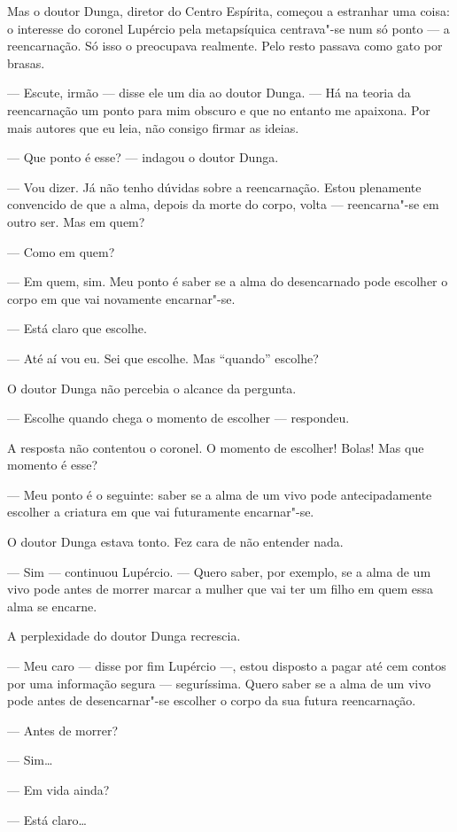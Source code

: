 Mas o doutor Dunga, diretor do Centro Espírita, começou a estranhar uma
coisa: o interesse do coronel Lupércio pela metapsíquica centrava"-se num
só ponto --- a reencarnação. Só isso o preocupava realmente. Pelo resto
passava como gato por brasas.

--- Escute, irmão --- disse ele um dia ao doutor Dunga. --- Há na teoria
da reencarnação um ponto para mim obscuro e que no entanto me apaixona.
Por mais autores que eu leia, não consigo firmar as ideias.

--- Que ponto é esse? --- indagou o doutor Dunga.

--- Vou dizer. Já não tenho dúvidas sobre a reencarnação. Estou
plenamente convencido de que a alma, depois da morte do corpo, volta ---
reencarna"-se em outro ser. Mas em quem?

--- Como em quem?

--- Em quem, sim. Meu ponto é saber se a alma do desencarnado pode
escolher o corpo em que vai novamente encarnar"-se.

--- Está claro que escolhe.

--- Até aí vou eu. Sei que escolhe. Mas ``quando'' escolhe?

O doutor Dunga não percebia o alcance da pergunta.

--- Escolhe quando chega o momento de escolher --- respondeu.

A resposta não contentou o coronel. O momento de escolher! Bolas! Mas
que momento é esse?

--- Meu ponto é o seguinte: saber se a alma de um vivo pode
antecipadamente escolher a criatura em que vai futuramente encarnar"-se.

O doutor Dunga estava tonto. Fez cara de não entender nada.

--- Sim --- continuou Lupércio. --- Quero saber, por exemplo, se a alma
de um vivo pode antes de morrer marcar a mulher que vai ter um filho em
quem essa alma se encarne.

A perplexidade do doutor Dunga recrescia.

--- Meu caro --- disse por fim Lupércio ---, estou disposto a pagar até
cem contos por uma informação segura --- seguríssima. Quero saber se a
alma de um vivo pode antes de desencarnar"-se escolher o corpo da sua
futura reencarnação.

--- Antes de morrer?

--- Sim\ldots{}

--- Em vida ainda?

--- Está claro\ldots{}

